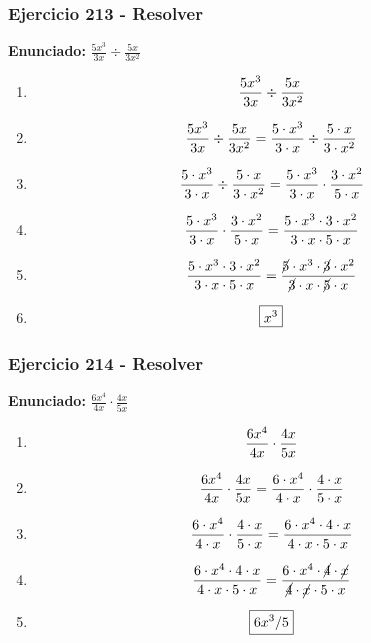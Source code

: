 \documentclass[11pt,a4paper]{article}
\newcommand{\fitmath}[1]{%
\[
\setbox0=\hbox{$\displaystyle #1$}%
\ifdim\wd0>\linewidth
\resizebox{\linewidth}{!}{$\displaystyle #1$}%
\else
#1%
\fi
\]
}
\begin{document}
\vspace{0.12cm}
\subsubsection*{Ejercicio 213 - Resolver}
\textbf{Enunciado:} $ \frac{5 x^{3}}{3 x} \div \frac{5 x}{3 x^{2}} $\par
\begin{enumerate}[leftmargin=2em]
\item \fitmath{\frac{5 x^{3}}{3 x} \div \frac{5 x}{3 x^{2}}}
\item \fitmath{\frac{5 x^{3}}{3 x} \div \frac{5 x}{3 x^{2}}= \frac{5\cdot x^{3}}{3\cdot x} \div \frac{5\cdot x}{3\cdot x^{2}}}
\item \fitmath{\frac{5\cdot x^{3}}{3\cdot x}\div \frac{5\cdot x}{3\cdot x^{2}}= \frac{5\cdot x^{3}}{3\cdot x}\cdot \frac{3\cdot x^{2}}{5\cdot x}}
\item \fitmath{\frac{5\cdot x^{3}}{3\cdot x}\cdot \frac{3\cdot x^{2}}{5\cdot x}= \frac{5\cdot x^{3}\cdot 3\cdot x^{2}}{3\cdot x\cdot 5\cdot x}}
\item \fitmath{\frac{5\cdot x^{3}\cdot 3\cdot x^{2}}{3\cdot x\cdot 5\cdot x}= \frac{\cancel{5}\cdot x^{3}\cdot \cancel{3}\cdot x^{2}}{\cancel{3}\cdot x\cdot \cancel{5}\cdot x}}
\item \fitmath{\boxed{x^{3}}}
\end{enumerate}

\vspace{0.12cm}
\subsubsection*{Ejercicio 214 - Resolver}
\textbf{Enunciado:} $ \frac{6 x^{4}}{4 x} \cdot \frac{4 x}{5 x} $\par
\begin{enumerate}[leftmargin=2em]
\item \fitmath{\frac{6 x^{4}}{4 x} \cdot \frac{4 x}{5 x}}
\item \fitmath{\frac{6 x^{4}}{4 x} \cdot \frac{4 x}{5 x}= \frac{6\cdot x^{4}}{4\cdot x} \cdot \frac{4\cdot x}{5\cdot x}}
\item \fitmath{\frac{6\cdot x^{4}}{4\cdot x}\cdot \frac{4\cdot x}{5\cdot x}= \frac{6\cdot x^{4}\cdot 4\cdot x}{4\cdot x\cdot 5\cdot x}}
\item \fitmath{\frac{6\cdot x^{4}\cdot 4\cdot x}{4\cdot x\cdot 5\cdot x}= \frac{6\cdot x^{4}\cdot \cancel{4}\cdot \cancel{x}}{\cancel{4}\cdot \cancel{x}\cdot 5\cdot x}}
\item \fitmath{\boxed{6 x^{3} / 5}}
\end{enumerate}
\end{document}
